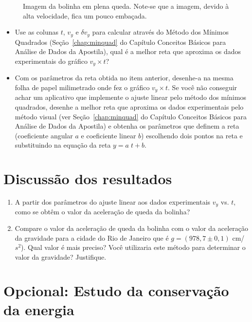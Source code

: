\begin{minipage}{\linewidth}
\begin{minipage}{0.3\linewidth}
\begin{figure}[H]
              \caption{\label{fig:reguacomxis}  Imagem da bolinha em plena queda. Note-se que a imagem, devido à alta velocidade, fica um pouco embaçada.}
          \end{figure}
      \end{minipage}
  \end{minipage}%

\begin{itemize}  
\item Use as colunas $t$, $v_y$ e $\delta v_y$ para  calcular através do Método dos Mínimos Quadrados (Seção~\ref{chap:minquad}  do Capítulo Conceitos Básicos para Análise de Dados da Apostila), qual é a melhor reta que aproxima os dados experimentais do gráfico $v_y \times t$?
\item Com os parâmetros da reta obtida no item anterior,  desenhe-a  na mesma folha de papel milimetrado 
onde fez o gráfico $v_y \times t$. Se você não conseguir achar um aplicativo que implemente o ajuste linear pelo método dos mínimos quadrados, desenhe a melhor reta que aproxima os dados experimentais 
pelo método visual (ver Seção~\ref{chap:minquad} do Capítulo Conceitos Básicos para Análise de Dados da Apostila) e obtenha os parâmetros que definem a reta 
(coeficiente angular $a$ e coeficiente linear $b$) escolhendo dois pontos na reta e substituindo na equação da reta $y=a\;t+b$.
\end{itemize}

\section{Discussão dos resultados}
\begin{enumerate}
\item A partir dos parâmetros do ajuste linear aos dados experimentais $v_y$ vs. $t$, 
como se obtêm o valor da aceleração de queda da bolinha?
\item 
Compare o valor da aceleração de queda da bolinha com o valor da aceleração da gravidade 
para a cidade do Rio de Janeiro que é $g=(978,7\pm 0,1)$ cm/$s^2$). 
Qual valor é mais preciso? Você utilizaria este método para determinar o valor da gravidade? Justifique.
\end{enumerate}


\section{Opcional: Estudo da conservação da energia}

